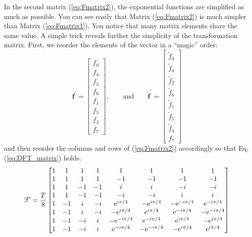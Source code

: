 In the second matrix (\ref{eq:Fmatrix2}), the exponential functions are simplified as much as possible.  You can see easily that Matrix (\ref{eq:Fmatrix2}) is much simpler than Matrix (\ref{eq:Fmatrix1}). You notice that many matrix elements share the same value. A simple trick reveals further the simplicity of the transformation matrix. First, we reorder the elements of the vector in a ``magic'' order:
\begin{equation}
\mathbf{f}^\prime = 
\begin{bmatrix}
f_0 \\ f_4 \\ f_2\\ f_6\\ f_1\\ f_5\\ f_3\\ f_7 
\end{bmatrix}, \qquad \text{and}
\qquad
\tilde{\mathbf{f}}^\prime = 
\begin{bmatrix}
\tilde{f}_0 \\ \tilde{f}_4 \\ \tilde{f}_2\\ \tilde{f}_6\\ \tilde{f}_1\\ \tilde{f}_5\\ \tilde{f}_3\\ f_7
\end{bmatrix}
\end{equation}
and then reorder the columns and rows of (\ref{eq:Fmatrix2}) accordingly so that Eq. (\ref{eq:DFT_matrix}) holds.
\begin{equation}
\mathcal{F}^\prime = \frac{T}{8}
\begin{bmatrix}
1 &  1 &               1  &                1 &                1 &                1 &                1 &                1 \\
1 &  1 &               1  &                1 &               -1 &               -1 &               -1 &               -1 \\
1 &  1 &              -1  &               -1 &                i &                i &               -i &               -i \\
1 &  1 &              -1  &               -1 &               -i &               -i &                i &                i \\
1 & -1 &               i  &               -i &  \text{e}^{ i  \pi/4} & -\text{e}^{ i  \pi/4} & -\text{e}^{-i  \pi/4} &  \text{e}^{-i  \pi/4} \\
1 & -1 &               i  &               -i & -\text{e}^{ i  \pi/4} &  \text{e}^{ i  \pi/4} &  \text{e}^{-i  \pi/4} & -\text{e}^{-i  \pi/4} \\
1 & -1 &              -i  &                i & -\text{e}^{-i  \pi/4} &  \text{e}^{-i  \pi/4} &  \text{e}^{ i  \pi/4} & -\text{e}^{ i  \pi/4} \\
1 & -1 &              -i  &                i &  \text{e}^{-i  \pi/4} & -\text{e}^{-i  \pi/4} & -\text{e}^{ i  \pi/4} &  \text{e}^{ i  \pi/4} 
\end{bmatrix}
\end{equation}
